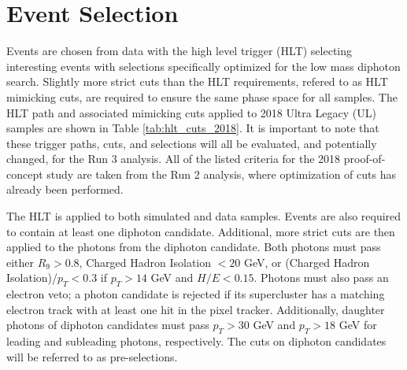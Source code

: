 \documentclass[12pt]{article}
\begin{document}
\section{Event Selection}
Events are chosen from data with the high level trigger (HLT) selecting interesting events with selections specifically optimized for the low mass diphoton search. Slightly more strict cuts than the HLT requirements, refered to as HLT mimicking cuts, are required to ensure the same phase space for all samples.
The HLT path and associated mimicking cuts applied to 2018 Ultra Legacy (UL) samples are shown in Table \ref{tab:hlt_cuts_2018}. It is important to note that these trigger paths, cuts, and selections will all be evaluated, and potentially changed, for the Run 3 analysis. All of the listed criteria for the 2018 proof-of-concept study are taken from the Run 2 analysis, where optimization of cuts has already been performed.\par

The HLT is applied to both simulated and data samples. Events are also required to contain at least one diphoton candidate. Additional, more strict cuts are then applied to the photons from the diphoton candidate. Both photons must pass either $R_9 > 0.8$, Charged Hadron Isolation $<20$ GeV, or (Charged Hadron Isolation)/$p_T < 0.3$ if $p_T > 14$ GeV and $H/E < 0.15$. Photons must also pass an electron veto; a photon candidate is rejected if its supercluster has a matching electron track with at least one hit in the pixel tracker. Additionally, daughter photons of diphoton candidates must pass $p_T > 30$ GeV and $p_T > 18$ GeV for leading and subleading photons, respectively. The cuts on diphoton candidates will be referred to as pre-selections.\par
\end{document}
